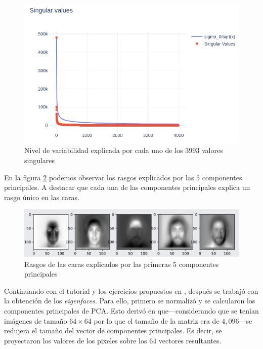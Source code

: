 \documentclass[conference]{IEEEtran}
\begin{document}
\begin{figure}[H]
    \centering
    \includegraphics[scale=0.35]{imgs/svd_variance.png}
    \caption{Nivel de variabilidad explicada por cada uno de los $3993$ valores singulares}
    \label{fig:svd_graph}
\end{figure}

En la figura \ref{fig:svd_pc} podemos observar los rasgos explicados por las $5$ componentes principales. A destacar que cada una de las componentes principales explica un rasgo único en las caras. 

\begin{figure}[H]
    \centering
    \includegraphics[scale=0.25]{imgs/first_5_pc.png}
    \caption{Rasgos de las caras explicados por las primeras $5$ componentes principales}
    \label{fig:svd_pc}
\end{figure}

Continuando con el tutorial y los ejercicios propuestos en \cite{sandipan}, después se trabajó con la obtención de los \textit{eigenfaces}. Para ello, primero se normalizó y se calcularon los componentes principales de PCA. Esto derivó en que---considerando que se tenían imágenes de tamaño $64 \times 64$ por lo que el tamaño de la matriz era de $4,096$---se redujera el tamaño del vector de componentes principales. Es decir, se proyectaron los valores de los pixeles sobre los $64$ vectores resultantes.
\end{document}
